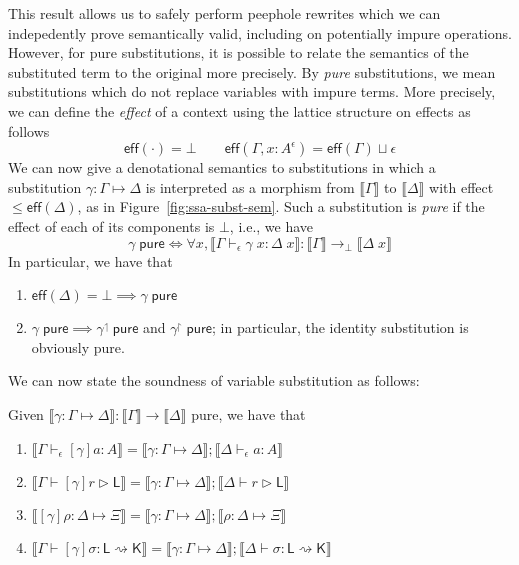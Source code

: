 \documentclass[acmsmall,screen,review]{acmart}
\newcommand{\ms}[1]{\ensuremath{\mathsf{#1}}}
\newcommand{\rupg}[1]{{#1}^\upharpoonright}
\newcommand{\lupg}[1]{{#1}^\upharpoonleft}
\newcommand{\thyp}[3]{#1 : {#2}^{#3}}
\newcommand{\hasty}[4]{#1 \vdash_{#2} #3: {#4}}
\newcommand{\haslb}[3]{#1 \vdash #2 \rhd #3}
\newcommand{\issubst}[3]{#1: #2 \mapsto #3}
\newcommand{\lbsubst}[4]{#1 \vdash #2: #3 \rightsquigarrow #4}
\newcommand{\dnt}[1]{\llbracket{#1}\rrbracket}
\newcommand{\substpure}[1]{#1\;\ms{pure}}
\begin{document}
This result allows us to safely perform peephole rewrites which we can indepedently prove
semantically valid, including on potentially impure operations. However, for pure substitutions, it
is possible to relate the semantics of the substituted term to the original more precisely. By
\emph{pure} substitutions, we mean substitutions which do not replace variables with impure terms.
More precisely, we can define the \emph{effect} of a context using the lattice structure on effects
as follows
\begin{equation}
  \ms{eff}(\cdot) = \bot \qquad 
  \ms{eff}(\Gamma, \thyp{x}{A}{\epsilon}) = \ms{eff}(\Gamma) \sqcup \epsilon
\end{equation}
We can now give a denotational semantics to substitutions in which a substitution
$\issubst{\gamma}{\Gamma}{\Delta}$ is interpreted as a morphism from $\dnt{\Gamma}$ to
$\dnt{\Delta}$ with effect $\leq \ms{eff}(\Delta)$, as in Figure~\ref{fig:ssa-subst-sem}. Such a
substitution is \emph{pure} if the effect of each of its components is $\bot$, i.e., we have
\begin{equation}
  \substpure{\gamma} \iff \forall x, \dnt{\hasty{\Gamma}{\epsilon}{\gamma\;x}{\Delta\;x}} 
    : \dnt{\Gamma} \to_\bot \dnt{\Delta\;x}
\end{equation}
In particular, we have that
\begin{enumerate}
  \item $\ms{eff}(\Delta) = \bot \implies \substpure{\gamma}$
  \item $\substpure{\gamma} \implies \substpure{\lupg{\gamma}}$ and $\substpure{\rupg{\gamma}}$; 
  in particular, the identity substitution is obviously pure.
\end{enumerate}
We can now state the soundness of variable substitution as follows:
\begin{theorem}[name=Soundness (Substitution), restate=soundnesssubst]
  Given $\dnt{\issubst{\gamma}{\Gamma}{\Delta}} : \dnt{\Gamma} \to \dnt{\Delta}$ pure, we have that
  \begin{enumerate}[label=(\alph*)]
    \item $\dnt{\hasty{\Gamma}{\epsilon}{[\gamma]a}{A}} 
      = \dnt{\issubst{\gamma}{\Gamma}{\Delta}};\dnt{\hasty{\Delta}{\epsilon}{a}{A}}$
      \label{itm:tm-subst-sound}
    \item $\dnt{\haslb{\Gamma}{[\gamma]r}{\ms{L}}}
      = \dnt{\issubst{\gamma}{\Gamma}{\Delta}};\dnt{\haslb{\Delta}{r}{\ms{L}}}$
    \item $\dnt{\issubst{[\gamma]\rho}{\Delta}{\Xi}}
      = \dnt{\issubst{\gamma}{\Gamma}{\Delta}};\dnt{\issubst{\rho}{\Delta}{\Xi}}$
    \item $\dnt{\lbsubst{\Gamma}{[\gamma]\sigma}{\ms{L}}{\ms{K}}}
      = \dnt{\issubst{\gamma}{\Gamma}{\Delta}};\dnt{\lbsubst{\Delta}{\sigma}{\ms{L}}{\ms{K}}}$
  \end{enumerate}
  \label{thm:subst-sound}
\end{theorem}
\end{document}
